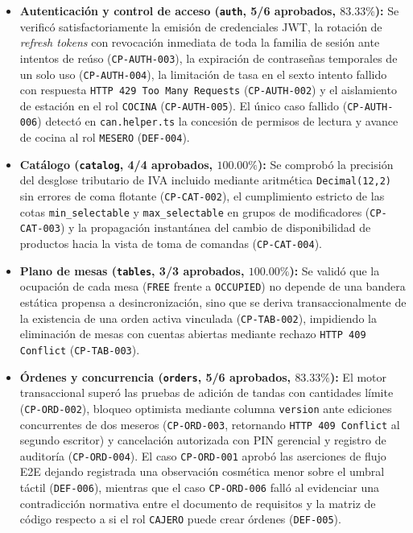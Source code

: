 \documentclass[stu,12pt,a4paper]{apa7}
\providecommand{\tightlist}{\setlength{\itemsep}{0pt}\setlength{\parskip}{0pt}}
\begin{document}
\begin{itemize}
\tightlist
\item
  \textbf{Autenticación y control de acceso (\texttt{auth}, 5/6 aprobados, \(83.33\%\)):} Se verificó satisfactoriamente la emisión de credenciales JWT, la rotación de \emph{refresh tokens} con revocación inmediata de toda la familia de sesión ante intentos de reúso (\texttt{CP-{}\allowbreak{}AUTH-{}\allowbreak{}003}), la expiración de contraseñas temporales de un solo uso (\texttt{CP-{}\allowbreak{}AUTH-{}\allowbreak{}004}), la limitación de tasa en el sexto intento fallido con respuesta \texttt{HTTP 429 Too Many \allowbreak{}Requests} (\texttt{CP-{}\allowbreak{}AUTH-{}\allowbreak{}002}) y el aislamiento de estación en el rol \texttt{COCINA} (\texttt{CP-{}\allowbreak{}AUTH-{}\allowbreak{}005}). El único caso fallido (\texttt{CP-{}\allowbreak{}AUTH-{}\allowbreak{}006}) detectó en \texttt{can.\allowbreak{}helper.\allowbreak{}ts} la concesión de permisos de lectura y avance de cocina al rol \texttt{MESERO} (\texttt{DEF-{}\allowbreak{}004}).
\item
  \textbf{Catálogo (\texttt{catalog}, 4/4 aprobados, \(100.00\%\)):} Se comprobó la precisión del desglose tributario de IVA incluido mediante aritmética \texttt{Decimal(\allowbreak{}12,\allowbreak{}2)\allowbreak{}} sin errores de coma flotante (\texttt{CP-{}\allowbreak{}CAT-{}\allowbreak{}002}), el cumplimiento estricto de las cotas \texttt{min\_\allowbreak{}selectable} y \texttt{max\_\allowbreak{}selectable} en grupos de modificadores (\texttt{CP-{}\allowbreak{}CAT-{}\allowbreak{}003}) y la propagación instantánea del cambio de disponibilidad de productos hacia la vista de toma de comandas (\texttt{CP-{}\allowbreak{}CAT-{}\allowbreak{}004}).
\item
  \textbf{Plano de mesas (\texttt{tables}, 3/3 aprobados, \(100.00\%\)):} Se validó que la ocupación de cada mesa (\texttt{FREE} frente a \texttt{OCCUPIED}) no depende de una bandera estática propensa a desincronización, sino que se deriva transaccionalmente de la existencia de una orden activa vinculada (\texttt{CP-{}\allowbreak{}TAB-{}\allowbreak{}002}), impidiendo la eliminación de mesas con cuentas abiertas mediante rechazo \texttt{HTTP 409 Conflict} (\texttt{CP-{}\allowbreak{}TAB-{}\allowbreak{}003}).
\item
  \textbf{Órdenes y concurrencia (\texttt{orders}, 5/6 aprobados, \(83.33\%\)):} El motor transaccional superó las pruebas de adición de tandas con cantidades límite (\texttt{CP-{}\allowbreak{}ORD-{}\allowbreak{}002}), bloqueo optimista mediante columna \texttt{version} ante ediciones concurrentes de dos meseros (\texttt{CP-{}\allowbreak{}ORD-{}\allowbreak{}003}, retornando \texttt{HTTP 409 Conflict} al segundo escritor) y cancelación autorizada con PIN gerencial y registro de auditoría (\texttt{CP-{}\allowbreak{}ORD-{}\allowbreak{}004}). El caso \texttt{CP-{}\allowbreak{}ORD-{}\allowbreak{}001} aprobó las aserciones de flujo E2E dejando registrada una observación cosmética menor sobre el umbral táctil (\texttt{DEF-{}\allowbreak{}006}), mientras que el caso \texttt{CP-{}\allowbreak{}ORD-{}\allowbreak{}006} falló al evidenciar una contradicción normativa entre el documento de requisitos y la matriz de código respecto a si el rol \texttt{CAJERO} puede crear órdenes (\texttt{DEF-{}\allowbreak{}005}).

\end{itemize}
\end{document}
